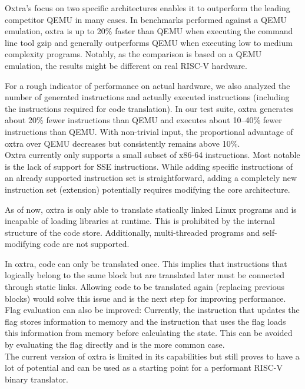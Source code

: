 Oxtra's focus on two specific architectures enables it to outperform the leading competitor QEMU in many cases. 
In benchmarks performed against a QEMU emulation, oxtra is up to 20\% faster than QEMU when executing the command line tool gzip and generally outperforms QEMU when executing low to medium complexity programs. 
Notably, as the comparison is based on a QEMU emulation, the results might be different on real RISC-V hardware. 

For a rough indicator of performance on actual hardware, we also analyzed the number of generated instructions and actually executed instructions (including the instructions required for code translation). 
In our test suite, oxtra generates about 20\% fewer instructions than QEMU and executes about 10--40\% fewer instructions than QEMU.
With non-trivial input, the proportional advantage of oxtra over QEMU decreases but consistently remains above 10\%.
\\

\noindent Oxtra currently only supports a small subset of x86-64 instructions. 
Most notable is the lack of support for SSE instructions. While adding specific instructions of an already supported instruction set is straightforward, adding a completely new instruction set (extension) potentially requires modifying the core architecture.

As of now, oxtra is only able to translate statically linked Linux programs and is incapable of loading libraries at runtime.
This is prohibited by the internal structure of the code store. 
Additionally, multi-threaded programs and self-modifying code are not supported.

In oxtra, code can only be translated once.
This implies that instructions that logically belong to the same block but are translated later must be connected through static links. 
Allowing code to be translated again (replacing previous blocks) would solve this issue and is the next step for improving performance.
Flag evaluation can also be improved: Currently, the instruction that updates the flag stores information to memory and the instruction that uses the flag loads this information from memory before calculating the state. 
This can be avoided by evaluating the flag directly and is the more common case. 
\\

\noindent The current version of oxtra is limited in its capabilities but still proves to have a lot of potential and can be used as a starting point for a performant RISC-V binary translator.